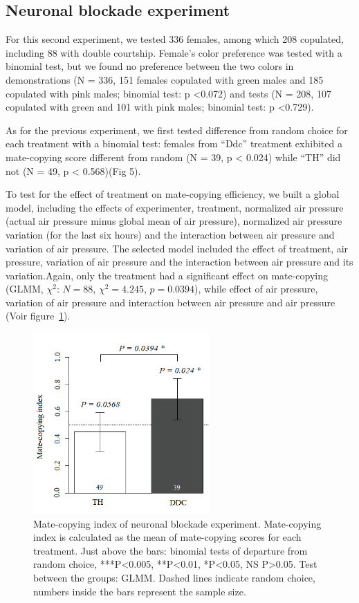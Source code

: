 \documentclass[a4paper, 12pt]{article}
\begin{document}
\subsection{Neuronal blockade experiment}

For this second experiment, we tested 336 females, among which 208 copulated, including 88 with double courtship. Female's color preference was tested with a binomial test, but we found no preference between the two colors in demonstrations (N = 336, 151 females copulated with green males and 185 copulated with pink males; binomial test: p {\textless}0.072) and tests (N = 208, 107 copulated with green and 101 with pink males; binomial test: p {\textless}0.729).

As for the previous experiment, we first tested difference from random choice for each treatment with a binomial test: females from ``Ddc'' treatment exhibited a mate-copying score different from random (N = 39, p {\textless} 0.024) while ``TH'' did not (N = 49, p {\textless} 0.568)(Fig 5).

To test for the effect of treatment on mate-copying efficiency, we built a global model, including the effects of experimenter, treatment, normalized air pressure (actual air pressure minus global mean of air pressure), normalized air pressure variation (for the last six hours) and the interaction between air pressure and variation of air pressure. The selected model included the effect of treatment, air pressure, variation of air pressure and the interaction between air pressure and its variation.Again, only the treatment had a significant effect on mate-copying (GLMM, $\chi^2$: $N = 88$, $\chi^2 = 4.245$, $p = 0.0394$), while effect of air pressure, variation of air pressure and interaction between air pressure and air pressure (Voir figure~\ref{fig:mcnb}).

\clearpage




\begin{figure}
	\centering
	\includegraphics[width=0.6\textwidth]{images/mcnb}
	\caption{Mate-copying index of neuronal blockade experiment. Mate-copying index is calculated as the mean of mate-copying scores for each treatment. Just above the bars: binomial tests of departure from random choice, ***P<0.005, **P<0.01, *P<0.05, NS P>0.05. Test between the groups: GLMM. Dashed lines indicate random choice, numbers inside the bars represent the sample size.}
	\label{fig:mcnb}
\end{figure}
\end{document}
